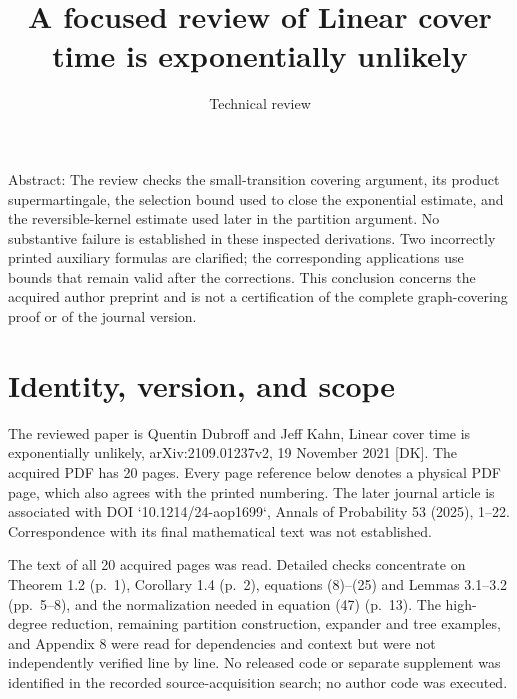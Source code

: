 \documentclass[10pt]{article}
\title{A focused review of
Linear cover time is exponentially unlikely}
\author{Technical review}
\date{}
\begin{document}
\maketitle
Abstract: The review checks the small-transition covering argument, its product supermartingale, the selection bound used to close the exponential estimate, and the reversible-kernel estimate used later in the partition argument. No substantive failure is established in these inspected derivations. Two incorrectly printed auxiliary formulas are clarified; the corresponding applications use bounds that remain valid after the corrections. This conclusion concerns the acquired author preprint and is not a certification of the complete graph-covering proof or of the journal version.\par
\section*{Identity, version, and scope}
The reviewed paper is Quentin Dubroff and Jeff Kahn, Linear cover time is exponentially unlikely, arXiv:2109.01237v2, 19 November 2021 [DK]. The acquired PDF has 20 pages. Every page reference below denotes a physical PDF page, which also agrees with the printed numbering. The later journal article is associated with DOI `10.1214/24-aop1699`, Annals of Probability 53 (2025), 1–22. Correspondence with its final mathematical text was not established.\par
The text of all 20 acquired pages was read. Detailed checks concentrate on Theorem 1.2 (p. 1), Corollary 1.4 (p. 2), equations (8)–(25) and Lemmas 3.1–3.2 (pp. 5–8), and the normalization needed in equation (47) (p. 13). The high-degree reduction, remaining partition construction, expander and tree examples, and Appendix 8 were read for dependencies and context but were not independently verified line by line. No released code or separate supplement was identified in the recorded source-acquisition search; no author code was executed.\par
\end{document}
